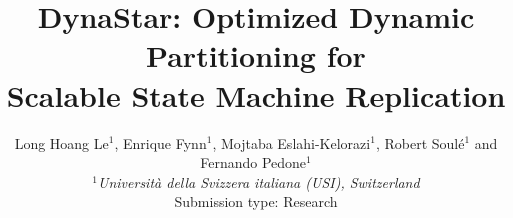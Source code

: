 \documentclass[svgnames,sigplan,10pt]{acmart}
\newcommand{\dynastar}{\mbox{DynaStar}\xspace}
\begin{document}
\title{\dynastar: Optimized Dynamic Partitioning for\\ Scalable State Machine Replication}
\author{Long Hoang Le$^1$, Enrique Fynn$^1$, Mojtaba Eslahi-Kelorazi$^1$, Robert Soul\'{e}$^1$ and Fernando Pedone$^1$ \\
\small {\em  $^1$Universit\`{a} della Svizzera italiana (USI), Switzerland} \\ [2mm]
\small Submission type: Research
}
\date{}
\maketitle


\begin{abstract}
  
\end{abstract}










%



%




\end{document}
